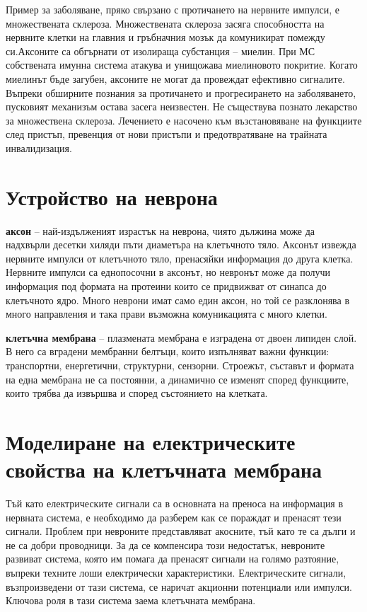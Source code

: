 \documentclass{article}
\begin{document}
Пример за заболяване, пряко свързано с протичането на нервните импулси, е множествената склероза. Множествената склероза засяга способността на нервните клетки на главния и гръбначния мозък да комуникират помежду си.Аксоните са обгърнати от изолираща субстанция – миелин. При МС собствената имунна система атакува и унищожава миелиновото покритие. Когато миелинът бъде загубен, аксоните не могат да провеждат ефективно сигналите. Въпреки обширните познания за протичането и прогресирането на заболяването, пусковият механизъм остава засега неизвестен. Не съществува познато лекарство за множествена склероза. Лечението е насочено към възстановяване на функциите след пристъп, превенция от нови пристъпи и предотвратяване на трайната инвалидизация.

\section{Устройство на неврона}

\textbf{аксон} -- най-издълженият израстък на неврона, чиято дължина може да надхвърли десетки хиляди пъти диаметъра на клетъчното тяло. Аксонът
извежда нервните импулси от клетъчното тяло, пренасяйки информация до друга клетка. Нервните импулси са еднопосочни в аксонът, но невронът
може да получи информация под формата на протеини които се придвижват от синапса до клетъчното ядро. Много неврони имат само един аксон, но
той се разклонява в много направления и така прави възможна комуникацията с много клетки. 

\textbf{клетъчна мембрана} -- плазмената мембрана е изградена от двоен липиден слой. В него са вградени мембранни белтъци, които изпълняват важни функции: транспортни, енергетични, структурни, сензорни. Строежът, съставът и формата на една мембрана не са постоянни, а динамично се изменят според функциите, които трябва да извършва и според състоянието на клетката.

\section{Моделиране на електрическите свойства на клетъчната мембрана}
Тъй като електрическите сигнали са в основната на преноса на информация в нервната система, е необходимо да разберем как се пораждат и пренасят тези сигнали. Проблем при невроните представляват акосните, тъй като те са дълги и не са добри проводници. За да се компенсира този недостатък, невроните развиват система, която им помага да пренасят сигнали на голямо разтояние, въпреки техните лоши електрически характеристики.  Електрическите сигнали, възпроизведени от тази система, се наричат акционни потенциали или импулси. Ключова роля в тази система заема клетъчната мембрана.
\end{document}
